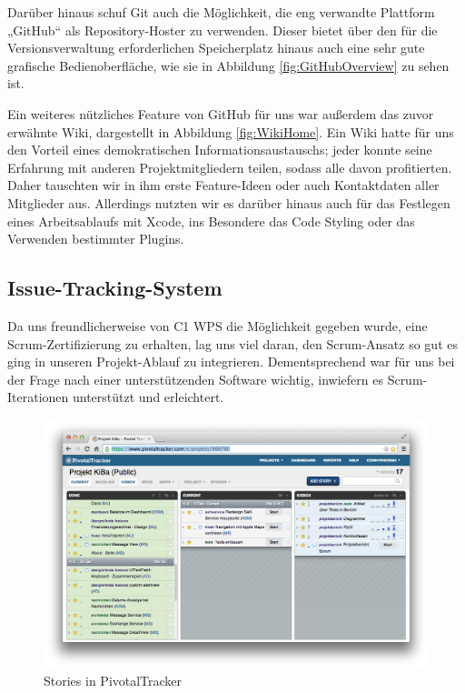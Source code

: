 	Darüber hinaus schuf Git auch die Möglichkeit, die eng verwandte Plattform „GitHub“ \citep{GitHub14} als Repository-Hoster zu verwenden. Dieser bietet über den für die Versionsverwaltung erforderlichen Speicherplatz hinaus auch eine sehr gute grafische Bedienoberfläche, wie sie in Abbildung \ref{fig:GitHubOverview} zu sehen ist.
	
	Ein weiteres nützliches Feature von GitHub für uns war außerdem das zuvor erwähnte Wiki, dargestellt in Abbildung \ref{fig:WikiHome}. Ein Wiki hatte für uns den Vorteil eines demokratischen Informationsaustauschs; jeder konnte seine Erfahrung mit anderen Projektmitgliedern teilen, sodass alle davon profitierten. Daher tauschten wir in ihm erste Feature-Ideen oder auch Kontaktdaten aller Mitglieder aus. Allerdings nutzten wir es darüber hinaus auch für das Festlegen eines Arbeitsablaufs mit Xcode, ins Besondere das Code Styling oder das Verwenden bestimmter Plugins.

\subsection{Issue-Tracking-System}
	Da uns freundlicherweise von C1 WPS die Möglichkeit gegeben wurde, eine Scrum-Zer\-ti\-fi\-zie\-rung zu erhalten, lag uns viel daran, den Scrum-Ansatz so gut es ging in unseren Projekt-Ablauf zu integrieren. Dementsprechend war für uns bei der Frage nach einer unterstützenden Software wichtig, inwiefern es Scrum-Iterationen unterstützt und erleichtert.
	
\begin{figure}[h]
	\centering
	\includegraphics[scale=.25]{Pictures/TrackerStories}
	\vspace{-.8cm}
	\caption{Stories in PivotalTracker\label{fig:TrackerStories}}
\end{figure}
	
